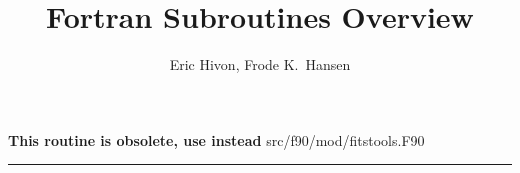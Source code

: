 
\sloppy


\title{\healpix Fortran Subroutines Overview}
 \section[read\_asctab*]{ }
\label{sub:read_asctab}
\author{Eric Hivon, Frode K.~Hansen}

\begin{facility}
{ {\bf This routine is obsolete, use  instead} }
{src/f90/mod/fitstools.F90}
\end{facility}

\rule{\hsize}{2mm}

\newpage
